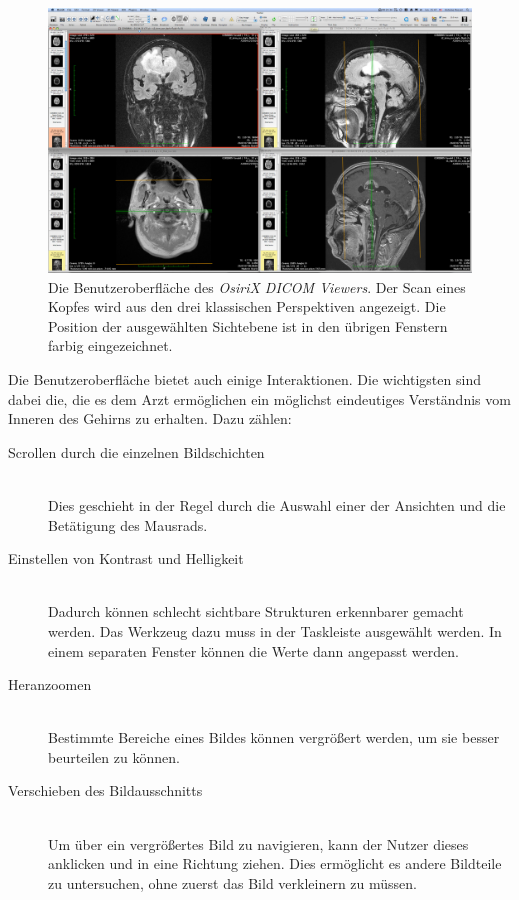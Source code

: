 \begin{figure}[!htb]
	\centering
	\includegraphics[width=0.7\linewidth]{images/osirix.jpg}
	\caption{Die Benutzeroberfläche des \textit{OsiriX DICOM Viewers}. Der Scan eines Kopfes wird aus den drei klassischen Perspektiven angezeigt. Die Position der ausgewählten Sichtebene ist in den übrigen Fenstern farbig eingezeichnet.}
	\label{img:mrtSoftware}
\end{figure}
\FloatBarrier

Die Benutzeroberfläche bietet auch einige Interaktionen. Die wichtigsten sind dabei die, die es dem Arzt ermöglichen ein möglichst eindeutiges Verständnis vom Inneren des Gehirns zu erhalten.  Dazu zählen:

\begin{description}
\item [Scrollen durch die einzelnen Bildschichten]\hfill \\
Dies geschieht in der Regel durch die Auswahl einer der Ansichten und die Betätigung des Mausrads. 
\item [Einstellen von Kontrast und Helligkeit]\hfill \\
Dadurch können schlecht sichtbare Strukturen erkennbarer gemacht werden. Das Werkzeug dazu muss in der Taskleiste ausgewählt werden. In einem separaten Fenster können die Werte dann angepasst werden. 
\item [Heranzoomen]\hfill \\
Bestimmte Bereiche eines Bildes können vergrößert werden, um sie besser beurteilen zu können.
\item [Verschieben des Bildausschnitts]\hfill \\
Um über ein vergrößertes Bild zu navigieren, kann der Nutzer dieses anklicken und in eine Richtung ziehen. Dies ermöglicht es andere Bildteile zu untersuchen, ohne zuerst das Bild verkleinern zu müssen.
\end{description}

